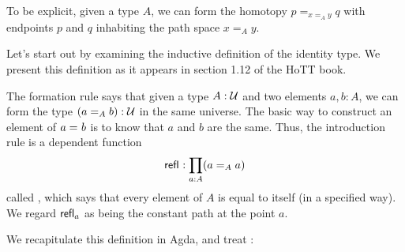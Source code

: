 To be explicit, given a type $A$, we can form the homotopy $p=_{x=_{A} y}q$
with endpoints $p$ and $q$ inhabiting the path space $x=_{A} y$.

Let's start out by examining the inductive definition of the identity type.  We
present this definition as it appears in section 1.12 of the HoTT book.

\begin{definition}
  The formation rule says that given a type $A:\UU$ and two elements $a,b:A$, we can form the type $(\id[A]{a}{b}):\UU$ in the same universe.
  The basic way to construct an element of $\id{a}{b}$ is to know that $a$ and $b$ are the same.
  Thus, the introduction rule is a dependent function
  \[\refl{} : \prod_{a:A} (\id[A]{a}{a}) \]
  called ,
  which says that every element of $A$ is equal to itself (in a specified way).  We regard $\refl{a}$ as being the
  constant path %
  at the point $a$.
\end{definition}

We recapitulate this definition in Agda, and treat : 

\begin{code}[hide]%
\>[0]\AgdaSymbol{\{-\#}\AgdaSpace{}%
\AgdaSpace{}%
\AgdaSpace{}%
\AgdaSymbol{\#-\}}\<%
\\
%
\\[\AgdaEmptyExtraSkip]%
\>[0]\AgdaSpace{}%
\AgdaSpace{}%
\<%
\end{code}

\begin{code}[hide]%
\>[0]\<%
\\
\>[0]\AgdaSpace{}%
\AgdaSpace{}%
\<%
\\
\>[0]\<%
\end{code}
\begin{code}%
\>[0]\<%
\\
\>[0][@{}l@{\AgdaIndent{1}}]%
\>[2]\AgdaSpace{}%
\AgdaSpace{}%
\AgdaSymbol{\{}\AgdaSpace{}%
\AgdaSymbol{:}\AgdaSpace{}%
\AgdaSymbol{\}}\AgdaSpace{}%
\AgdaSymbol{:}\AgdaSpace{}%
\AgdaSymbol{(}\AgdaSpace{}%
\AgdaSpace{}%
\AgdaSymbol{:}\AgdaSpace{}%
\AgdaSymbol{)}\AgdaSpace{}%
\AgdaSpace{}%
\AgdaSpace{}%
\<%
\\
\>[2][@{}l@{\AgdaIndent{0}}]%
\>[4]\AgdaSpace{}%
\AgdaSymbol{:}\AgdaSpace{}%
\AgdaSymbol{(}\AgdaSpace{}%
\AgdaSymbol{:}\AgdaSpace{}%
\AgdaSymbol{)}\AgdaSpace{}%
\AgdaSpace{}%
\AgdaSpace{}%
\AgdaSpace{}%
\<%
\\
\>[0]\<%
\end{code}


